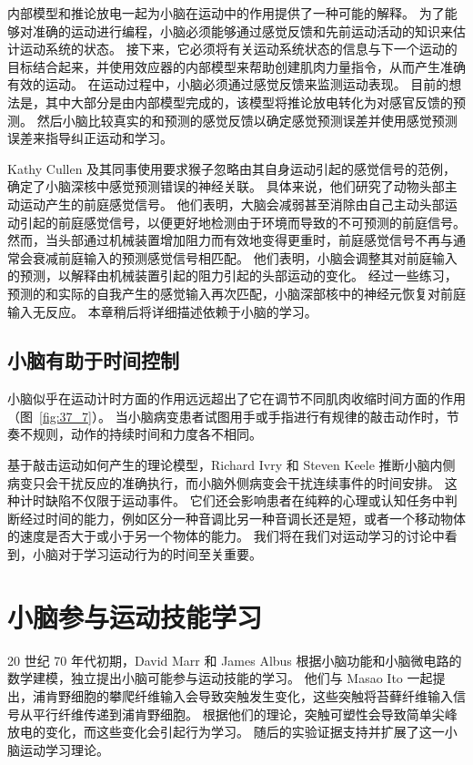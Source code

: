 内部模型和推论放电一起为小脑在运动中的作用提供了一种可能的解释。
为了能够对准确的运动进行编程，小脑必须能够通过感觉反馈和先前运动活动的知识来估计运动系统的状态。
接下来，它必须将有关运动系统状态的信息与下一个运动的目标结合起来，并使用效应器的内部模型来帮助创建肌肉力量指令，从而产生准确有效的运动。
在运动过程中，小脑必须通过感觉反馈来监测运动表现。
目前的想法是，其中大部分是由内部模型完成的，该模型将推论放电转化为对感官反馈的预测。
然后小脑比较真实的和预测的感觉反馈以确定感觉预测误差并使用感觉预测误差来指导纠正运动和学习。


Kathy Cullen 及其同事使用要求猴子忽略由其自身运动引起的感觉信号的范例，确定了小脑深核中感觉预测错误的神经关联。
具体来说，他们研究了动物头部主动运动产生的前庭感觉信号。
他们表明，大脑会减弱甚至消除由自己主动头部运动引起的前庭感觉信号，以便更好地检测由于环境而导致的不可预测的前庭信号。
然而，当头部通过机械装置增加阻力而有效地变得更重时，前庭感觉信号不再与通常会衰减前庭输入的预测感觉信号相匹配。
他们表明，小脑会调整其对前庭输入的预测，以解释由机械装置引起的阻力引起的头部运动的变化。
经过一些练习，预测的和实际的自我产生的感觉输入再次匹配，小脑深部核中的神经元恢复对前庭输入无反应。
本章稍后将详细描述依赖于小脑的学习。



\subsection{小脑有助于时间控制}

小脑似乎在运动计时方面的作用远远超出了它在调节不同肌肉收缩时间方面的作用（图~\ref{fig:37_7}）。
当小脑病变患者试图用手或手指进行有规律的敲击动作时，节奏不规则，动作的持续时间和力度各不相同。


基于敲击运动如何产生的理论模型，Richard Ivry 和 Steven Keele 推断小脑内侧病变只会干扰反应的准确执行，而小脑外侧病变会干扰连续事件的时间安排。
这种计时缺陷不仅限于运动事件。
它们还会影响患者在纯粹的心理或认知任务中判断经过时间的能力，例如区分一种音调比另一种音调长还是短，或者一个移动物体的速度是否大于或小于另一个物体的能力。
我们将在我们对运动学习的讨论中看到，小脑对于学习运动行为的时间至关重要。



\section{小脑参与运动技能学习}

20 世纪 70 年代初期，David Marr 和 James Albus 根据小脑功能和小脑微电路的数学建模，独立提出小脑可能参与运动技能的学习。
他们与 Masao Ito 一起提出，浦肯野细胞的攀爬纤维输入会导致突触发生变化，这些突触将苔藓纤维输入信号从平行纤维传递到浦肯野细胞。
根据他们的理论，突触可塑性会导致简单尖峰放电的变化，而这些变化会引起行为学习。
随后的实验证据支持并扩展了这一小脑运动学习理论。



